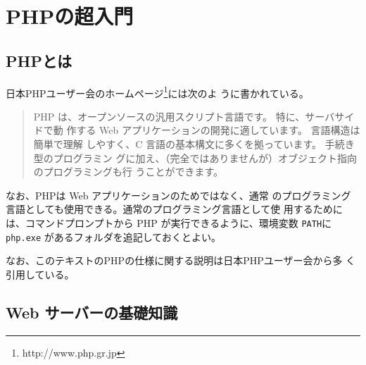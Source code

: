 \chapter{PHPの超入門}
\section{PHPとは}
日本PHPユーザー会のホームページ\footnote{http://www.php.gr.jp}には次のよ
うに書かれている。
\begin{quotation}
PHP は、オープンソースの汎用スクリプト言語です。 特に、サーバサイドで動
 作する Web アプリケーションの開発に適しています。 言語構造は簡単で理解
 しやすく、C 言語の基本構文に多くを拠っています。 手続き型のプログラミン
 グに加え、（完全ではありませんが）オブジェクト指向のプログラミングも行
 うことができます。
\end{quotation}
なお、PHPは Web アプリケーションのためではなく、通常
のプログラミング言語としても使用できる。通常のプログラミング言語として使
用するためには、コマンドプロンプトから PHP が実行できるように、環境変数
\texttt{PATH}に \texttt{php.exe} があるフォルダを追記しておくとよい。

なお、このテキストのPHPの仕様に関する説明は日本PHPユーザー会から多
く引用している。

\section{Web サーバーの基礎知識}
